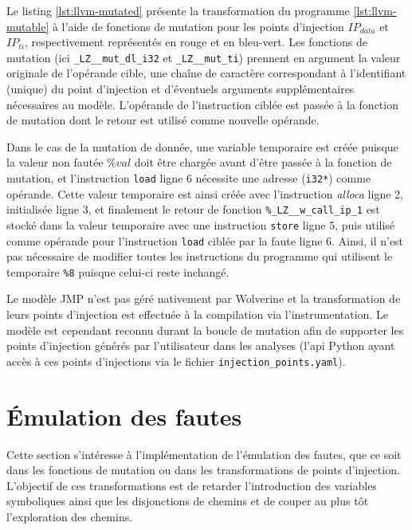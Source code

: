             Le listing \ref{lst:llvm-mutated} présente la transformation du programme \ref{lst:llvm-mutable} à l'aide de fonctions de mutation pour les points d'injection $IP_{data}$ et $IP_{ti}$, respectivement représentés en rouge et en bleu-vert.
            Les fonctions de mutation (ici \texttt{\_LZ\_\_mut\_dl\_i32} et \texttt{\_LZ\_\_mut\_ti}) prennent en argument la valeur originale de l'opérande cible, une chaîne de caractère correspondant à l'identifiant (unique) du point d'injection et d'éventuels arguments supplémentaires nécessaires au modèle.
            L'opérande de l'instruction ciblée est passée à la fonction de mutation dont le retour est utilisé comme nouvelle opérande. 
            
            Dans le cas de la mutation de donnée, une variable temporaire est créée puisque la valeur non fautée $\%val$ doit être chargée avant d'être passée à la fonction de mutation, et l'instruction \texttt{load} ligne 6 nécessite une adresse (\texttt{i32*}) comme opérande. Cette valeur temporaire est ainsi créée avec l'instruction \textit{alloca} ligne 2, initialisée ligne 3, et finalement le retour de fonction \texttt{\%\_LZ\_\_w\_call\_ip\_1} est stocké dans la valeur temporaire avec une instruction \texttt{store} ligne 5, puis utilisé comme opérande pour l'instruction \texttt{load} ciblée par la faute ligne 6. Ainsi, il n'est pas nécessaire de modifier toutes les instructions du programme qui utilisent le temporaire \texttt{\%8} puisque celui-ci reste inchangé.

            Le modèle \gls{JMP} n'est pas géré nativement par Wolverine et la transformation de leurs points d'injection est effectuée à la compilation via l'instrumentation.
            Le modèle est cependant reconnu durant la boucle de mutation afin de supporter les points d'injection générés par l'utilisateur dans les analyses (l'\gls{api} Python ayant accès à ces points d'injections via le fichier \texttt{injection\_points.yaml}). 
                
    \section{Émulation des fautes}
    \label{sec:lazart-impl-mfct}
    
        Cette section s'intéresse à l'implémentation de l'émulation des fautes, que ce soit dans les fonctions de mutation ou dans les transformations de points d'injection.
        L'objectif de ces transformations est de retarder l'introduction des variables symboliques ainsi que les disjonctions de chemins et de couper au plus tôt l'exploration des chemins.
        
